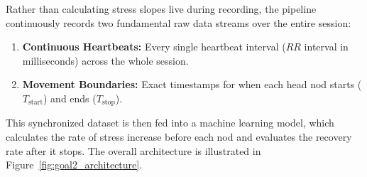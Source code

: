 \documentclass[12pt,a4paper,oneside]{report}
\begin{document}
Rather than calculating stress slopes live during recording, the pipeline continuously records two fundamental raw data streams over the entire session:
\begin{enumerate}[leftmargin=1.5cm, label=\textbf{\arabic*.}]
    \item \textbf{Continuous Heartbeats:} Every single heartbeat interval ($RR$ interval in milliseconds) across the whole session.
    \item \textbf{Movement Boundaries:} Exact timestamps for when each head nod starts ($T_{\text{start}}$) and ends ($T_{\text{stop}}$).
\end{enumerate}
This synchronized dataset is then fed into a machine learning model, which calculates the rate of stress increase before each nod and evaluates the recovery rate after it stops. The overall architecture is illustrated in Figure~\ref{fig:goal2_architecture}.
\end{document}
